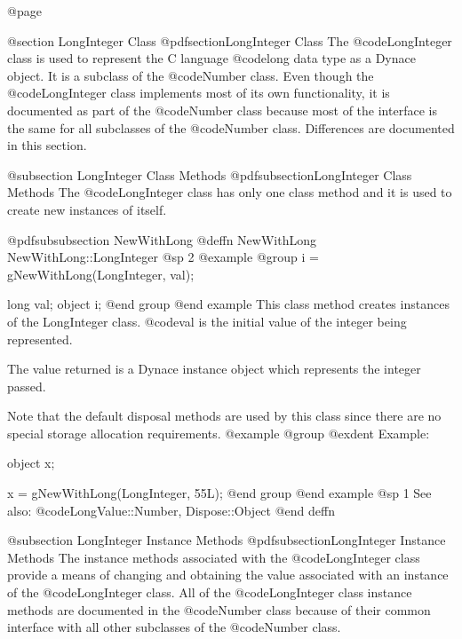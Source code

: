 @page

@section LongInteger Class
@pdfsection{LongInteger Class}
The @code{LongInteger} class is used to represent the C language
@code{long} data type as a Dynace object.  It is a subclass of the
@code{Number} class.  Even though the @code{LongInteger} class
implements most of its own functionality, it is documented as part of
the @code{Number} class because most of the interface is the same for
all subclasses of the @code{Number} class.  Differences are documented
in this section.





@subsection LongInteger Class Methods
@pdfsubsection{LongInteger Class Methods}
The @code{LongInteger} class has only one class method and it is used to
create new instances of itself.



@pdfsubsubsection {NewWithLong}
@deffn {NewWithLong} NewWithLong::LongInteger
@sp 2
@example
@group
i = gNewWithLong(LongInteger, val);

long    val;
object  i;
@end group
@end example
This class method creates instances of the LongInteger class.  @code{val}
is the initial value of the integer being represented.  

The value returned is a Dynace instance object which represents the integer
passed.

Note that the default disposal methods are used by this class since
there are no special storage allocation requirements.
@example
@group
@exdent Example:

object  x;

x = gNewWithLong(LongInteger, 55L);
@end group
@end example
@sp 1
See also:  @code{LongValue::Number, Dispose::Object}
@end deffn





@subsection LongInteger Instance Methods
@pdfsubsection{LongInteger Instance Methods}
The instance methods associated with the @code{LongInteger} class
provide a means of changing and obtaining the value associated with an
instance of the @code{LongInteger} class.  All of the
@code{LongInteger} class instance methods are documented in the
@code{Number} class because of their common interface with all other
subclasses of the @code{Number} class.

















